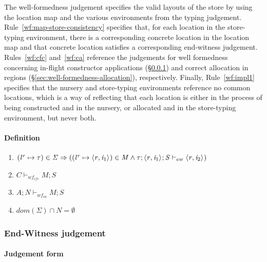\documentclass[showabstract,showacknowledgments,showpreface,showdedication,school]{iuphd}
\theoremstyle{nonumberplain}
\newcommand{\keywd}[1]{\mathit{#1}}
\newcommand{\skeywd}[1]{\mathit{#1}}
\newcommand{\TYP}{\keywd{\tau}}
\newcommand{\loc}{\skeywd{l}}
\newcommand{\concreteloc}[3]{\ensuremath{\langle #1, #2 \rangle ^{#3}}}
\newcommand{\reg}{\skeywd{r}}
\newcommand{\ind}{\keywd{i}}
\newcommand{\STOR}{\keywd{S}}
\newcommand{\CENV}{\keywd{C}}
\newcommand{\SENV}{\keywd{\Sigma}}
\newcommand{\MENV}{\keywd{M}}
\newcommand{\AENV}{\keywd{A}}
\newcommand{\NENV}{\keywd{N}}
\newcommand{\locreg}[2]{\ensuremath{{#1}^{#2}}}
\newcommand{\ewitness}[4]{\ensuremath{#1;#2;#3 \vdash_{ew} #4}}
\newcommand{\storewfcfa}[3]{\ensuremath{#1 \vdash_{wf_{cfc}} #2;#3}}
\newcommand{\storewfca}[4]{\ensuremath{#1;#2 \vdash_{wf_{ca}} #3;#4}}
\newcommand{\secref}[1]{\S\ref{#1}}
\begin{document}
The well-formedness judgement specifies the valid layouts of the store by using the location
map and the various environments from the typing judgement.
Rule~\ref{wf:map-store-consistency} specifies that, for each location in the store-typing environment,
there is a corresponding concrete location in the location map and that concrete location satisfies
a corresponding end-witness judgement.
Rules~\ref{wf:cfc} and~\ref{wf:ca} reference the judgements for well formedness concerning
in-flight constructor applications (\secref{sec:end-witness}) and correct allocation in
regions (\secref{sec:well-formedness-allocation}), respectively.
Finally, Rule~\ref{wf:impl1} specifies that the nursery and store-typing environments reference
no common locations, which is a way of reflecting that each location is either in the process
of being constructed and in the nursery, or allocated and in the store-typing environment, but
never both.

\paragraph{Definition}

\begin{enumerate}

    \item \label{wf:map-store-consistency} $ (\locreg{\loc}{\reg} \mapsto \TYP) \in \SENV \Rightarrow \\
            ((\locreg{\loc}{\reg} \mapsto \concreteloc{\reg}{\ind_1}{}) \in \MENV \wedge \\
            \ewitness{\TYP}{\concreteloc{\reg}{\ind_1}{}}{\STOR}{\concreteloc{\reg}{\ind_2}{}})
          $

    \item \label{wf:cfc} $\storewfcfa{\CENV}{\MENV}{\STOR}$

    \item \label{wf:ca} $\storewfca{\AENV}{\NENV}{\MENV}{\STOR}$

    \item \label{wf:impl1} $dom(\SENV) \cap \NENV = \emptyset $
\end{enumerate}


\subsubsection{End-Witness judgement}
\label{sec:end-witness}

\paragraph{Judgement form}
\end{document}
